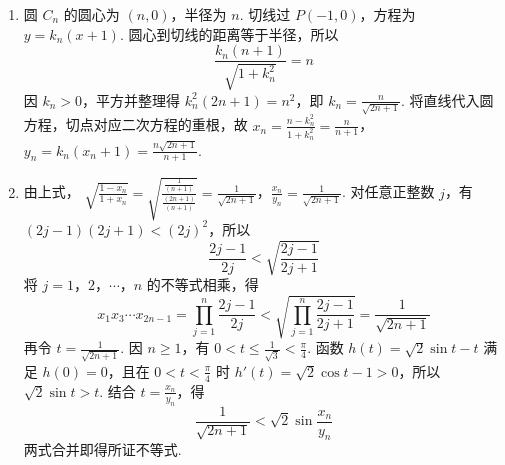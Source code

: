 \begin{solution}
\begin{enumerate}
\item 圆 \(C_n\) 的圆心为 \((n,0)\)，半径为 \(n\). 切线过 \(P(-1,0)\)，方程为 \(y=k_n(x+1)\). 圆心到切线的距离等于半径，所以
\[
\frac{k_n(n+1)}{\sqrt{1+k_n^2}}=n
\]
因 \(k_n>0\)，平方并整理得 \(k_n^2(2n+1)=n^2\)，即 \(k_n=\frac n{\sqrt{2n+1}}\). 将直线代入圆方程，切点对应二次方程的重根，故
\(x_n=\frac{n-k_n^2}{1+k_n^2}=\frac n{n+1}\)，\(y_n=k_n(x_n+1)=\frac{n\sqrt{2n+1}}{n+1}\).
\item 由上式，
\(\sqrt{\frac{1-x_n}{1+x_n}}=\sqrt{\frac{\frac{1}{(n+1)}}{\frac{(2n+1)}{(n+1)}}}=\frac1{\sqrt{2n+1}}\)，\(\frac{x_n}{y_n}=\frac1{\sqrt{2n+1}}\).
对任意正整数 \(j\)，有 \((2j-1)(2j+1)<(2j)^2\)，所以
\[
\frac{2j-1}{2j}<\sqrt{\frac{2j-1}{2j+1}}
\]
将 \(j=1\)，\(2\)，\(\cdots\)，\(n\) 的不等式相乘，得
\[
x_1x_3\cdots x_{2n-1}=\prod_{j=1}^n\frac{2j-1}{2j}<\sqrt{\prod_{j=1}^n\frac{2j-1}{2j+1}}=\frac1{\sqrt{2n+1}}
\]
再令 \(t=\frac1{\sqrt{2n+1}}\). 因 \(n\geqslant1\)，有 \(0<t\leqslant\frac1{\sqrt3}<\frac\pi4\). 函数 \(h(t)=\sqrt2\sin t-t\) 满足 \(h(0)=0\)，且在 \(0<t<\frac\pi4\) 时 \(h'(t)=\sqrt2\cos t-1>0\)，所以 \(\sqrt2\sin t>t\). 结合 \(t=\frac{x_n}{y_n}\)，得
\[
\frac1{\sqrt{2n+1}}<\sqrt2\sin\frac{x_n}{y_n}
\]
两式合并即得所证不等式.
\end{enumerate}
\end{solution}
